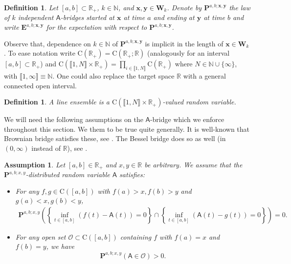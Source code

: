 \documentclass[]{article}
\newtheorem{defn}[thm]{Definition}
\newtheorem{ass}[thm]{Assumption}
\begin{document}
\begin{defn}
Let $[a,b]\subset\mathbb{R}_+$, $k\in\mathbb{N}$, and $\mathbf{x},\mathbf{y}\in\mathbf{W}_{k}$.
Denote by
$\mathbf{P}^{a,b;\mathbf{x},\mathbf{y}}$ the law of $k$ independent $\mathsf{A}$-bridges
started at $\mathbf{x}$ at time $a$ and ending at $\mathbf{y}$ at time $b$ and write 
$\mathbf{E}^{a,b;\mathbf{x},\mathbf{y}}$ for the expectation with respect to
$\mathbf{P}^{a,b;\mathbf{x},\mathbf{y}}$.
\end{defn}

Observe that, dependence on $k\in \mathbb{N}$ of $\mathbf{P}^{a,b;\mathbf{x},\mathbf{y}}$ is implicit in the length of $\mathbf{x} \in \mathbf{W}_k$. To ease notation write $\mathrm{C}(\mathbb{R}_+)=\mathrm{C}(\mathbb{R}_+;\mathbb{R})$ (analogously for an interval $[a,b]\subset \mathbb{R}_+$) and $\mathrm{C}(\llbracket 1, N \rrbracket \times \mathbb{R}_+)=\prod_{i\in \llbracket 1, N \rrbracket } \mathrm{C}(\mathbb{R}_+)$ where $N\in \mathbb{N}\cup \{\infty\}$, with $\llbracket 1, \infty \rrbracket\equiv\mathbb{N}$. One could also replace the target space $\mathbb{R}$ with a general connected open interval.

\begin{defn}
A line ensemble is a $\mathrm{C}(\llbracket 1, N \rrbracket \times \mathbb{R}_+)$-valued random variable.
\end{defn}

We will need the following assumptions on the $\mathsf{A}$-bridge which we enforce throughout this section. We them to be true quite generally. It is well-known that Brownian bridge satisfies these, see \cite{CorwinHammond1}. The Bessel bridge does so as well (in $(0,\infty)$ instead of $\mathbb{R}$), see \cite{XuanWuBessel}.

\begin{ass}\label{ass-bridge}
Let $[a,b]\in\mathbb{R}_+$ and $x,y\in \mathbb{R}$ be arbitrary. We assume that the 
    $\mathbf{P}^{a,b;x,y}$-distributed random variable $\mathsf{A}$ satisfies:
\begin{itemize}
    \item [1.] 
    For any $f,g \in \mathrm{C}\left([a,b]\right)$ with $f(a)>x,f(b)>y$ and $g(a)<x, g(b)<y$, 
\begin{align}\label{noTouch}
    \mathbf{P}^{a,b;x,y}\left(\left\{\inf_{t\in[a,b]}\left(f(t)-\mathsf{A}(t)\right) = 0\right\}\cap
    \left\{\inf_{t\in[a,b]}\left(\mathsf{A}(t)- g(t)\right) = 0\right\}\right) = 0.
\end{align}
\item [2.]
For any open set \(\mathscr{O} \subset \mathrm{C}\left([a,b]\right)\) containing \(f\) with \(f(a) = x\) and \(f(b) = y\), we have
\[
\mathbf{P}^{a,b;x,y}\left(\mathsf{A} \in\mathscr{O}  \right) > 0.
\]

\end{itemize}

\end{ass}
\end{document}
